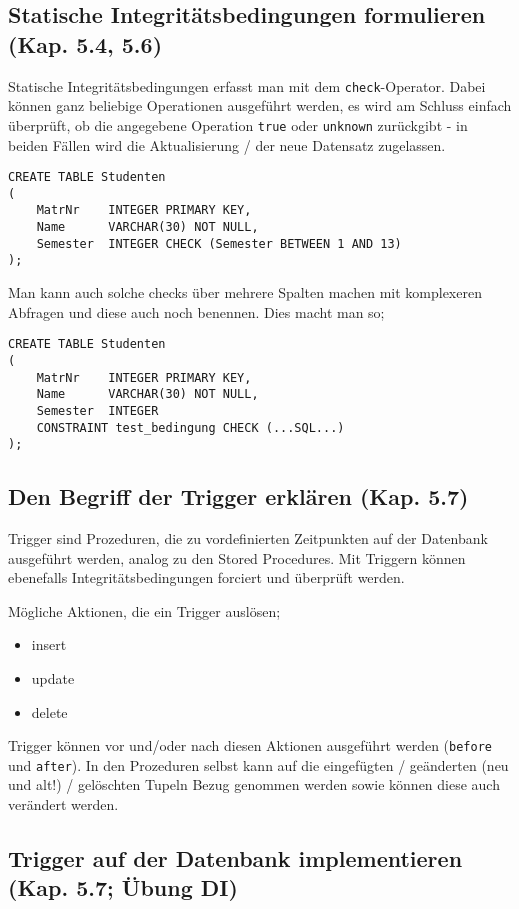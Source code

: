 \subsection{Statische Integritätsbedingungen formulieren (Kap. 5.4, 5.6)}
Statische Integritätsbedingungen erfasst man mit dem \texttt{check}-Operator. Dabei können ganz beliebige Operationen ausgeführt werden, es wird am Schluss einfach überprüft, ob die angegebene Operation \texttt{true} oder \texttt{unknown} zurückgibt - in beiden Fällen wird die Aktualisierung / der neue Datensatz zugelassen.
\begin{lstlisting}[caption={Beispiel mit check}]
CREATE TABLE Studenten
(
    MatrNr    INTEGER PRIMARY KEY,
    Name      VARCHAR(30) NOT NULL,
    Semester  INTEGER CHECK (Semester BETWEEN 1 AND 13)
);
\end{lstlisting}

Man kann auch solche checks über mehrere Spalten machen mit komplexeren Abfragen und diese auch noch benennen. Dies macht man so;

\begin{lstlisting}[caption={Beispiel mit check und Constraint}]
CREATE TABLE Studenten
(
    MatrNr    INTEGER PRIMARY KEY,
    Name      VARCHAR(30) NOT NULL,
    Semester  INTEGER
    CONSTRAINT test_bedingung CHECK (...SQL...)
);
\end{lstlisting}

\subsection{Den Begriff der Trigger erklären (Kap. 5.7)}
Trigger sind Prozeduren, die zu vordefinierten Zeitpunkten auf der Datenbank ausgeführt werden, analog zu den Stored Procedures. Mit Triggern können ebenefalls Integritätsbedingungen forciert und überprüft werden.

Mögliche Aktionen, die ein Trigger auslösen;
\begin{itemize}
  \item insert
  \item update
  \item delete
\end{itemize}

Trigger können vor und/oder nach diesen Aktionen ausgeführt werden (\texttt{before} und \texttt{after}). In den Prozeduren selbst kann auf die eingefügten / geänderten (neu und alt!) / gelöschten Tupeln Bezug genommen werden sowie können diese auch verändert werden.

\subsection{Trigger auf der Datenbank implementieren (Kap. 5.7; Übung DI)}


